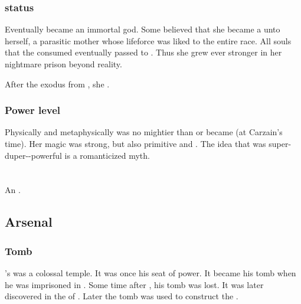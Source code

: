 \subsubsection{\Dweomer status}
Eventually \Tiamat became an immortal god. 
Some believed that she became a \dweomer unto herself, a parasitic mother whose lifeforce was liked to the entire \draconian race. 
All souls that the \dragons consumed eventually passed to \Tiamat.
Thus she grew ever stronger in her nightmare prison beyond reality. 

After the exodus from \Miith, she .





\subsubsection{Power level}
Physically and metaphysically \Kserasshana{} was no mightier than \Secherdamon{} or \Ishnaruchaefir{} became (at Carzain's time). 
Her magic was strong, but also primitive and \naive. 
The idea that \Kserasshana{} was super-duper-\uber-powerful is a romanticized myth. 















\section{\ValcanSethicus}
\index{\Sethicus}
An \ophidian. 









\subsection{Arsenal}





\subsubsection{Tomb}
\Sethicus's  was a colossal temple. 
It was once his seat of power.
It became his tomb when he was imprisoned in . 
Some time after , his tomb was lost. 
It was later discovered in the  of . 
Later the tomb was used to construct the . 









